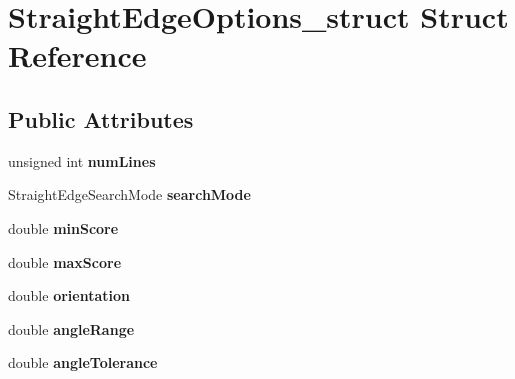 \hypertarget{structStraightEdgeOptions__struct}{
\section{StraightEdgeOptions\_\-struct Struct Reference}
\label{structStraightEdgeOptions__struct}
}
\subsection*{Public Attributes}
\begin{DoxyCompactItemize}
\item 
\hypertarget{structStraightEdgeOptions__struct_a9acfea7e3b91cbb439f4043356e4cb27}{
unsigned int {\bfseries numLines}}
\label{structStraightEdgeOptions__struct_a9acfea7e3b91cbb439f4043356e4cb27}

\item 
\hypertarget{structStraightEdgeOptions__struct_a0d59adc47245c1ac6c24e0a455fb7c42}{
StraightEdgeSearchMode {\bfseries searchMode}}
\label{structStraightEdgeOptions__struct_a0d59adc47245c1ac6c24e0a455fb7c42}

\item 
\hypertarget{structStraightEdgeOptions__struct_ad4602b2956e69240a372fcfe4331ca18}{
double {\bfseries minScore}}
\label{structStraightEdgeOptions__struct_ad4602b2956e69240a372fcfe4331ca18}

\item 
\hypertarget{structStraightEdgeOptions__struct_ac4a057fb62c4cddc7081be8e6fbccff6}{
double {\bfseries maxScore}}
\label{structStraightEdgeOptions__struct_ac4a057fb62c4cddc7081be8e6fbccff6}

\item 
\hypertarget{structStraightEdgeOptions__struct_a86da6e05a1d135fd9c5742ae38161bb3}{
double {\bfseries orientation}}
\label{structStraightEdgeOptions__struct_a86da6e05a1d135fd9c5742ae38161bb3}

\item 
\hypertarget{structStraightEdgeOptions__struct_ab7866682c6497d0b1064bce5eeabec8b}{
double {\bfseries angleRange}}
\label{structStraightEdgeOptions__struct_ab7866682c6497d0b1064bce5eeabec8b}

\item 
\hypertarget{structStraightEdgeOptions__struct_a549faee59059302a4310486ff08e8b2d}{
double {\bfseries angleTolerance}}
\label{structStraightEdgeOptions__struct_a549faee59059302a4310486ff08e8b2d}


\end{DoxyCompactItemize}
